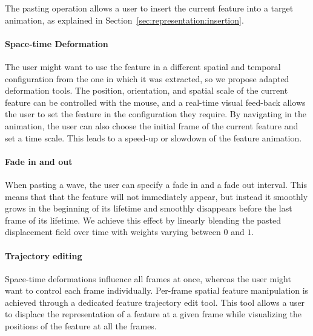 \documentclass[review]{acmsiggraph}
\begin{document}
The pasting operation allows a user to insert the current feature into a target animation, as explained in Section~\ref{sec:representation:insertion}.

\paragraph{Space-time Deformation}

The user might want to use the feature in a different spatial and temporal configuration from the one in which it was extracted, so we propose adapted deformation tools.
The position, orientation, and spatial scale of the current feature can be controlled with the mouse, and a real-time visual feed-back allows the user to set the feature in the configuration they require. 
By navigating in the animation, the user can also choose the initial frame of the current feature and set a time scale. 
This leads to a speed-up or slowdown of the feature animation.

\paragraph{Fade in and out}

When pasting a wave, the user can specify a fade in and a fade out interval. 
This means that that the feature will not immediately appear, but instead it smoothly grows in the beginning of its lifetime and smoothly disappears before the last frame of its lifetime. 
We achieve this effect by linearly blending the pasted displacement field over time with weights varying between $0$ and $1$.


\paragraph{Trajectory editing}

Space-time deformations influence all frames at once, whereas the user might want to control each frame individually.
Per-frame spatial feature manipulation is achieved through a dedicated feature trajectory edit tool.
This tool allows a user to displace the representation of a feature at a given frame while visualizing the positions of the feature at all the frames.

\end{document}
